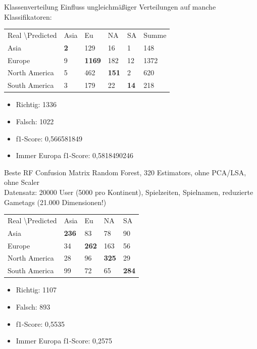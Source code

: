 \documentclass[12pt]{beamer}
\begin{document}
\begin{frame}[fragile]{Klassenverteilung}
	Einfluss ungleichmäßiger Verteilungen auf manche Klassifikatoren: \\
	\begin{tabular}{|l|l|l|l|l|l|}
		\hline
		Real \textbackslash Predicted & Asia & Eu & NA & SA & Summe\\
		Asia & \textbf{2} & 129 & 16 & 1 & 148 \\
		Europe & 9 & \textbf{1169} & 182 & 12 & 1372 \\
		North America & 5 & 462 & \textbf{151} &2 & 620 \\
		South America & 3 & 179 & 22 & \textbf{14} & 218 \\
		\hline
	\end{tabular}
	\begin{itemize}
		\item Richtig: 1336
		\item Falsch: 1022
		\item f1-Score: 0,566581849
		\item Immer Europa f1-Score: 0,5818490246
	\end{itemize}				
\end{frame}

\begin{frame}[fragile]{Beste RF Confusion Matrix}
	Random Forest, 320 Estimators, ohne PCA/LSA, ohne Scaler \\
	Datensatz: 20000 User (5000 pro Kontinent), Spielzeiten, Spielnamen, reduzierte Gametags (21.000 Dimensionen!)\\
	\medskip
	\begin{tabular}{| l| l| l| l| l|}
		\hline
		Real \textbackslash Predicted & Asia & Eu & NA & SA \\
		Asia & \textbf{236} & 83 & 78 & 90 \\
		Europe & 34 & \textbf{262} & 163 & 56 \\
		North America & 28 & 96 & \textbf{325} & 29 \\
		South America & 99 & 72 & 65 & \textbf{284} \\
		\hline
	\end{tabular}
	\begin{itemize}
		\item Richtig: 1107
		\item Falsch: 893
		\item f1-Score: 0,5535
		\item Immer Europa f1-Score: 0,2575
	\end{itemize}
\end{frame}
\end{document}
